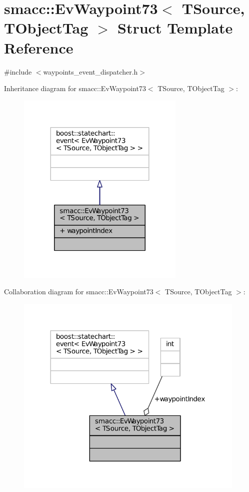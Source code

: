 \hypertarget{structsmacc_1_1EvWaypoint73}{}\section{smacc\+:\+:Ev\+Waypoint73$<$ T\+Source, T\+Object\+Tag $>$ Struct Template Reference}
\label{structsmacc_1_1EvWaypoint73}


{\ttfamily \#include $<$waypoints\+\_\+event\+\_\+dispatcher.\+h$>$}



Inheritance diagram for smacc\+:\+:Ev\+Waypoint73$<$ T\+Source, T\+Object\+Tag $>$\+:
\nopagebreak
\begin{figure}[H]
\begin{center}
\leavevmode
\includegraphics[width=227pt]{structsmacc_1_1EvWaypoint73__inherit__graph}
\end{center}
\end{figure}


Collaboration diagram for smacc\+:\+:Ev\+Waypoint73$<$ T\+Source, T\+Object\+Tag $>$\+:
\nopagebreak
\begin{figure}[H]
\begin{center}
\leavevmode
\includegraphics[width=312pt]{structsmacc_1_1EvWaypoint73__coll__graph}
\end{center}
\end{figure}
